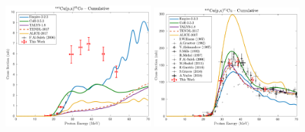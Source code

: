 \begin{figure}
 
 \includegraphics[width=0.49\textwidth]{./figures/61Co.pdf}
 \includegraphics[width=0.49\textwidth]{./figures/61Cu.pdf}

\vspace{-20pt} 
\end{figure}


